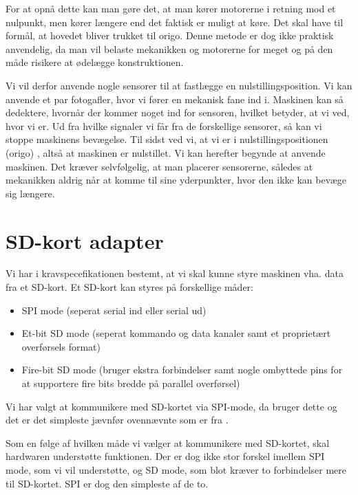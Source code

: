 For at opnå dette kan man gøre det, at man kører motorerne i retning
mod et nulpunkt, men kører længere end det faktisk er muligt at
køre. Det skal have til formål, at hovedet bliver trukket til
origo. Denne metode er dog ikke praktisk anvendelig, da man vil belaste
mekanikken og motorerne for meget og på den måde risikere at ødelægge
konstruktionen.

Vi vil derfor anvende nogle sensorer til at fastlægge en
nulstillingsposition. Vi kan anvende et par fotogafler, hvor vi fører
en mekanisk fane ind i. Maskinen kan så dedektere, hvornår der kommer
noget ind for sensoren, hvilket betyder, at vi ved, hvor vi er. Ud fra
hvilke signaler vi får fra de forskellige sensorer, så kan vi stoppe
maskinens bevægelse. Til sidst ved vi, at vi er i
nulstillingspositionen (origo) , altså at maskinen er nulstillet. Vi
kan herefter begynde at anvende maskinen. Det kræver selvfølgelig, at
man placerer sensorerne, således at mekanikken aldrig når at komme til
sine yderpunkter, hvor den ikke kan bevæge sig længere.


\section{SD-kort adapter}
\label{sc:sda}

Vi har i kravspecefikationen bestemt, at vi skal kunne styre maskinen
vha. data fra et SD-kort. Et SD-kort kan styres på forskellige måder:

\begin{itemize} \firmlist
\item{SPI mode (seperat serial ind eller serial ud)}
\item{Et-bit SD mode (seperat kommando og data kanaler samt et
    proprietært overførsels format)}
\item{Fire-bit SD mode (bruger ekstra forbindelser samt nogle
    ombyttede pins for at supportere fire bits bredde på parallel
    overførsel)}
\end{itemize}

Vi har valgt at kommunikere med SD-kortet via SPI-mode, da
\cite{web:captain-mmc} bruger dette og det er det simpleste jævnfør
ovennævnte som er fra \cite{web:sd-pinout}.

Som en følge af hvilken måde vi vælger at kommunikere med SD-kortet,
skal hardwaren understøtte funktionen. Der er dog ikke stor forskel imellem
SPI mode, som vi vil understøtte, og SD mode, som blot kræver to
forbindelser mere til SD-kortet. SPI er dog den simpleste
af de to.

